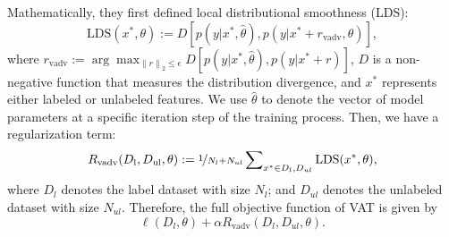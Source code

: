 Mathematically, 
they first defined local distributional smoothness (LDS):
\begin{equation}
\text{LDS}(x^*,\theta):=D[p(y|x^*,\hat{\theta}),p(y|x^*+r_{\text{vadv}},\theta)],
\end{equation}
where
$r_{\text{vadv}}
:= \arg\max\nolimits_{\left\lVert r \right\rVert_2 \leq \epsilon} 
D[ p(y|x^*,\hat{\theta}),p(y|x^*+r) ]$,
$D$ is a non-negative function that measures the distribution divergence, and
$x^*$ represents either labeled or unlabeled features. We use $\hat{\theta}$ to
denote the vector of model parameters at a specific iteration step of the
training process. Then, we have a regularization term:
\begin{equation*}
R_{\text{vadv}}(D_\mathrm{l},D_\mathrm{ul},\theta)
:=\nicefrac{1}{N_l+N_{ul}}
\sum\nolimits_{x^* \in D_l,D_{ul}}\text{LDS}(x^*,\theta),
\end{equation*}
where $D_l$ denotes the label dataset with size $N_l$; and $D_{ul}$ denotes the unlabeled dataset with size $N_{ul}$. 
Therefore, the full objective function of VAT is given by
\begin{equation*}
\ell(D_l,\theta) + \alpha R_{\text{vadv}}(D_l,D_{ul},\theta).
\end{equation*}

